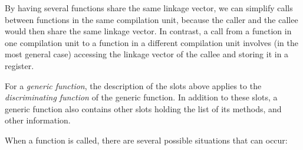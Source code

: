 By having several functions share the same linkage vector, we can
simplify calls between functions in the same compilation unit, because
the caller and the callee would then share the same linkage vector.
In contrast, a call from a function in one compilation unit to a
function in a different compilation unit involves (in the most general
case) accessing the linkage vector of the callee and storing it in a
register.

For a \emph{generic function}, the description of the slots above
applies to the \emph{discriminating function} of the generic function.
In addition to these slots, a generic function also contains other
slots holding the list of its methods, and other information.

When a function is called, there are several possible situations that
can occur:

